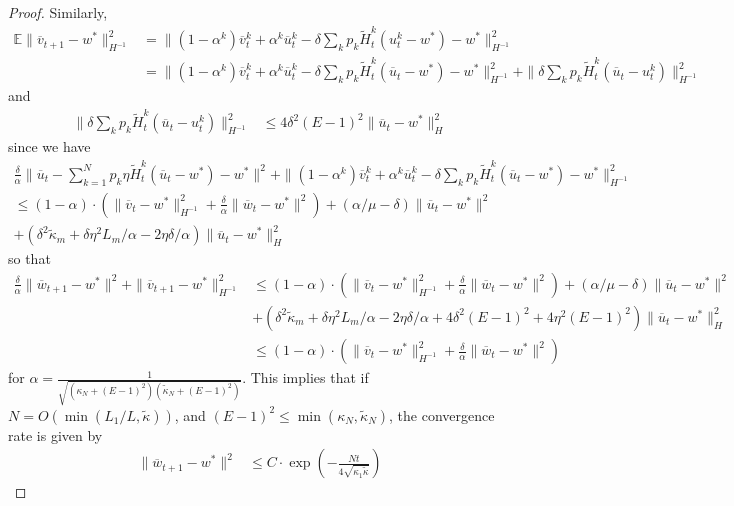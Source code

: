 \begin{proof}
		Similarly, 
		\begin{align*}
		\mathbb{E}\|\overline{v}_{t+1}-w^{\ast}\|_{H^{-1}}^{2} & =\|(1-\alpha^{k})\overline{v}_{t}^{k}+\alpha^{k}\overline{u}_{t}^{k}-\delta\sum_{k}p_{k}\tilde{H}_{t}^{k}(u_{t}^{k}-w^{\ast})-w^{\ast}\|_{H^{-1}}^{2}\\
		& =\|(1-\alpha^{k})\overline{v}_{t}^{k}+\alpha^{k}\overline{u}_{t}^{k}-\delta\sum_{k}p_{k}\tilde{H}_{t}^{k}(\overline{u}_{t}-w^{\ast})-w^{\ast}\|_{H^{-1}}^{2}+\|\delta\sum_{k}p_{k}\tilde{H}_{t}^{k}(\overline{u}_{t}-u_{t}^{k})\|_{H^{-1}}^{2}
		\end{align*}
		and 
		\begin{align*}
		\|\delta\sum_{k}p_{k}\tilde{H}_{t}^{k}(\overline{u}_{t}-u_{t}^{k})\|_{H^{-1}}^{2} & \leq4\delta^{2}(E-1)^{2}\|\overline{u}_{t}-w^{\ast}\|_{H}^{2}
		\end{align*}
		since we have 
		\begin{align*}
		\frac{\delta}{\alpha}\|\overline{u}_{t}-\sum_{k=1}^{N}p_{k}\eta\tilde{H}_{t}^{k}(\overline{u}_{t}-w^{\ast})-w^{\ast}\|^{2}+\|(1-\alpha^{k})\overline{v}_{t}^{k}+\alpha^{k}\overline{u}_{t}^{k}-\delta\sum_{k}p_{k}\tilde{H}_{t}^{k}(\overline{u}_{t}-w^{\ast})-w^{\ast}\|_{H^{-1}}^{2}\\
		\leq(1-\alpha)\cdot(\|\overline{v}_{t}-w^{\ast}\|_{H^{-1}}^{2}+\frac{\delta}{\alpha}\|\overline{w}_{t}-w^{\ast}\|^{2})+(\alpha/\mu-\delta)\|\overline{u}_{t}-w^{\ast}\|^{2}\\
		+(\delta^{2}\tilde{\kappa}_{m}+\delta\eta^{2}L_{m}/\alpha-2\eta\delta/\alpha)\|\overline{u}_{t}-w^{\ast}\|_{H}^{2}
		\end{align*}
		so that 
		\begin{align*}
		\frac{\delta}{\alpha}\|\overline{w}_{t+1}-w^{\ast}\|^{2}+\|\overline{v}_{t+1}-w^{\ast}\|_{H^{-1}}^{2} & \leq(1-\alpha)\cdot(\|\overline{v}_{t}-w^{\ast}\|_{H^{-1}}^{2}+\frac{\delta}{\alpha}\|\overline{w}_{t}-w^{\ast}\|^{2})+(\alpha/\mu-\delta)\|\overline{u}_{t}-w^{\ast}\|^{2}\\
		& +(\delta^{2}\tilde{\kappa}_{m}+\delta\eta^{2}L_{m}/\alpha-2\eta\delta/\alpha+4\delta^{2}(E-1)^{2}+4\eta^{2}(E-1)^{2})\|\overline{u}_{t}-w^{\ast}\|_{H}^{2}\\
		& \leq(1-\alpha)\cdot(\|\overline{v}_{t}-w^{\ast}\|_{H^{-1}}^{2}+\frac{\delta}{\alpha}\|\overline{w}_{t}-w^{\ast}\|^{2})
		\end{align*}
		for $\alpha=\frac{1}{\sqrt{(\kappa_{N}+(E-1)^{2})(\tilde{\kappa}_{N}+(E-1)^{2})}}$.
		This implies that if $N=O(\min(L_{1}/L,\tilde{\kappa}))$, and $(E-1)^{2}\leq\min(\kappa_{N},\tilde{\kappa}_{N})$,
		the convergence rate is given by 
		\begin{align*}
		\|\overline{w}_{t+1}-w^{\ast}\|^{2} & \leq C\cdot\exp(-\frac{Nt}{4\sqrt{\kappa_{1}\tilde{\kappa}}})
		\end{align*}
	\end{proof}